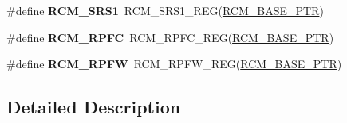 \begin{DoxyCompactItemize}
\item 
\hypertarget{group___r_c_m___register___accessor___macros_gaa2e190bc843511a82e9ec826029fbaaa}{}\#define {\bfseries R\+C\+M\+\_\+\+S\+R\+S1}~R\+C\+M\+\_\+\+S\+R\+S1\+\_\+\+R\+E\+G(\hyperlink{group___r_c_m___peripheral_ga25ab3aa8d593d455ed36a52c77f88234}{R\+C\+M\+\_\+\+B\+A\+S\+E\+\_\+\+P\+T\+R})\label{group___r_c_m___register___accessor___macros_gaa2e190bc843511a82e9ec826029fbaaa}

\item 
\hypertarget{group___r_c_m___register___accessor___macros_ga1c19f66051e218d534efc33ec09cc461}{}\#define {\bfseries R\+C\+M\+\_\+\+R\+P\+F\+C}~R\+C\+M\+\_\+\+R\+P\+F\+C\+\_\+\+R\+E\+G(\hyperlink{group___r_c_m___peripheral_ga25ab3aa8d593d455ed36a52c77f88234}{R\+C\+M\+\_\+\+B\+A\+S\+E\+\_\+\+P\+T\+R})\label{group___r_c_m___register___accessor___macros_ga1c19f66051e218d534efc33ec09cc461}

\item 
\hypertarget{group___r_c_m___register___accessor___macros_ga4cf7545d65e6e6c3e1848b7687d8f367}{}\#define {\bfseries R\+C\+M\+\_\+\+R\+P\+F\+W}~R\+C\+M\+\_\+\+R\+P\+F\+W\+\_\+\+R\+E\+G(\hyperlink{group___r_c_m___peripheral_ga25ab3aa8d593d455ed36a52c77f88234}{R\+C\+M\+\_\+\+B\+A\+S\+E\+\_\+\+P\+T\+R})\label{group___r_c_m___register___accessor___macros_ga4cf7545d65e6e6c3e1848b7687d8f367}

\end{DoxyCompactItemize}


\subsection{Detailed Description}
